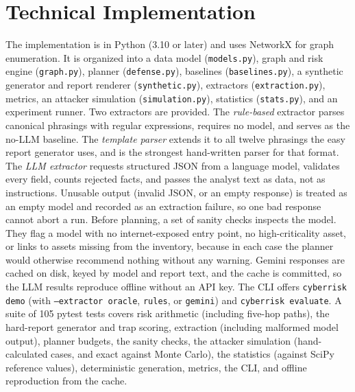 \documentclass[11pt]{article}
\begin{document}
\section{Technical Implementation}
The implementation is in Python (3.10 or later) and uses NetworkX for graph enumeration. It is organized into a data model (\texttt{models.py}), graph and risk engine (\texttt{graph.py}), planner (\texttt{defense.py}), baselines (\texttt{baselines.py}), a synthetic generator and report renderer (\texttt{synthetic.py}), extractors (\texttt{extraction.py}), metrics, an attacker simulation (\texttt{simulation.py}), statistics (\texttt{stats.py}), and an experiment runner. Two extractors are provided. The \emph{rule-based} extractor parses canonical phrasings with regular expressions, requires no model, and serves as the no-LLM baseline. The \emph{template parser} extends it to all twelve phrasings the easy report generator uses, and is the strongest hand-written parser for that format. The \emph{LLM extractor} requests structured JSON from a language model, validates every field, counts rejected facts, and passes the analyst text as data, not as instructions. Unusable output (invalid JSON, or an empty response) is treated as an empty model and recorded as an extraction failure, so one bad response cannot abort a run. Before planning, a set of sanity checks inspects the model. They flag a model with no internet-exposed entry point, no high-criticality asset, or links to assets missing from the inventory, because in each case the planner would otherwise recommend nothing without any warning. Gemini responses are cached on disk, keyed by model and report text, and the cache is committed, so the LLM results reproduce offline without an API key. The CLI offers \texttt{cyberrisk demo} (with \texttt{--extractor oracle}, \texttt{rules}, or \texttt{gemini}) and \texttt{cyberrisk evaluate}. A suite of 105 pytest tests covers risk arithmetic (including five-hop paths), the hard-report generator and trap scoring, extraction (including malformed model output), planner budgets, the sanity checks, the attacker simulation (hand-calculated cases, and exact against Monte Carlo), the statistics (against SciPy reference values), deterministic generation, metrics, the CLI, and offline reproduction from the cache.
\end{document}
